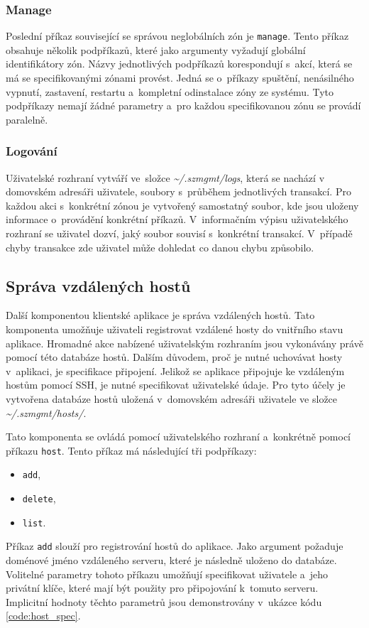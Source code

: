 \subsubsection{Manage}
\label{chapter:implementation:client:cli:manage}
Poslední příkaz související se správou neglobálních zón je \verb|manage|. Tento příkaz obsahuje několik podpříkazů, které
jako argumenty vyžadují globální identifikátory zón. Názvy jednotlivých podpříkazů korespondují s~akcí, která se má se specifikovanými
zónami provést. Jedná se o~příkazy spuštění, nenásilného vypnutí, zastavení, restartu a~kompletní odinstalace zóny ze systému.
Tyto podpříkazy nemají žádné parametry a~pro každou specifikovanou zónu se provádí paralelně.
\subsubsection{Logování}
\label{chapter:implementation:client:cli:logs}
Uživatelské rozhraní vytváří ve~složce \textit{\textasciitilde/.szmgmt/logs}, která se nachází v domovském adresáři uživatele, soubory s~průběhem
jednotlivých transakcí. Pro každou akci s~konkrétní zónou je vytvořený samostatný soubor, kde jsou uloženy informace o~provádění
konkrétní příkazů. V~informačním výpisu uživatelského rozhraní se uživatel dozví, jaký soubor souvisí s~konkrétní transakcí.
V~případě chyby transakce zde uživatel může dohledat co danou chybu způsobilo. 
\subsection{Správa vzdálených hostů}
\label{chapter:implementation:client:hosts}
Další komponentou klientské aplikace je správa vzdálených hostů. Tato komponenta umožňuje uživateli registrovat vzdálené 
hosty do vnitřního stavu aplikace. Hromadné akce nabízené uživatelským rozhraním jsou vykonávány právě pomocí této databáze
hostů. Dalším důvodem, proč je nutné uchovávat hosty v~aplikaci, je specifikace připojení. Jelikož se aplikace připojuje ke
vzdáleným hostům pomocí SSH, je nutné specifikovat uživatelské údaje. Pro tyto účely je vytvořena databáze hostů uložená
v~domovském adresáři uživatele ve složce \textit{\textasciitilde/.szmgmt/hosts/}.

Tato komponenta se ovládá pomocí uživatelského rozhraní a~konkrétně pomocí příkazu \verb|host|. Tento příkaz má následující
tři podpříkazy:
\begin{itemize}
 \item \verb|add|,
 \item \verb|delete|,
 \item \verb|list|.
\end{itemize}
Příkaz \verb|add| slouží pro registrování hostů do aplikace. Jako argument požaduje doménové jméno vzdáleného
serveru, které je následně uloženo do databáze. Volitelné parametry tohoto příkazu umožňují specifikovat uživatele a~jeho
privátní klíče, které mají být použity pro připojování k~tomuto serveru. Implicitní hodnoty těchto parametrů jsou demonstrovány
v~ukázce kódu \ref{code:host_spec}.

